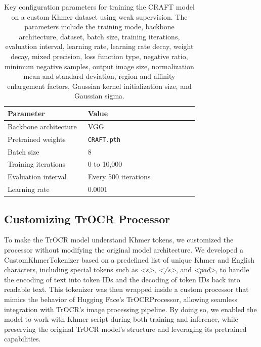 \begin{table}[H]
\centering
\begin{tabular}{|p{0.4\linewidth}|p{0.55\linewidth}|}
\hline
\textbf{Parameter} & \textbf{Value} \\
\hline
Backbone architecture & VGG \\
Pretrained weights & \texttt{CRAFT.pth} \\
Batch size & 8 \\
Training iterations & 0 to 10,000 \\
Evaluation interval & Every 500 iterations \\
Learning rate & 0.0001 \\
\hline
\end{tabular}
\caption{Key configuration parameters for training the CRAFT model on a custom Khmer dataset 
using weak supervision. The parameters include the training mode, backbone architecture, 
dataset, batch size, training iterations, evaluation interval, learning rate, learning rate decay, 
weight decay, mixed precision, loss function type, negative ratio, minimum negative samples, 
output image size, normalization mean and standard deviation, region and affinity enlargement 
factors, Gaussian kernel initialization size, and Gaussian sigma.}
\label{tab:craft-training-config}
\end{table}


\subsection{Customizing TrOCR Processor}
\label{subsec:customizing-trocr-processor}
        To make the TrOCR model understand Khmer tokens, 
we customized the processor without modifying the original 
model architecture. We developed a CustomKhmerTokenizer 
based on a predefined list of unique Khmer and English characters, 
including special tokens such as \textit{<s>}, \textit{</s>}, and 
\textit{<pad>}, to handle 
the encoding of text into token IDs and the decoding of token IDs 
back into readable text. This tokenizer was then wrapped inside 
a custom processor that mimics the behavior of Hugging Face’s 
TrOCRProcessor, allowing seamless integration with TrOCR’s image 
processing pipeline. By doing so, we enabled the model to work 
with Khmer script during both training and inference, while 
preserving the original TrOCR model’s structure and leveraging 
its pretrained capabilities.


